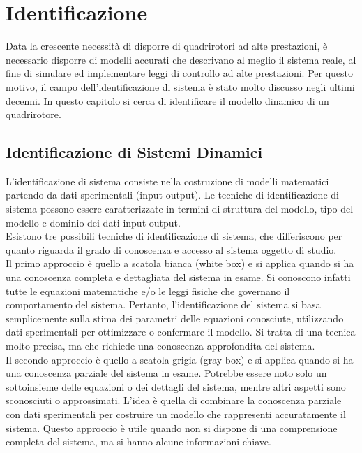 
\chapter{Identificazione}\label{ch:ident}
Data la crescente necessità di disporre di quadrirotori ad alte prestazioni, è necessario disporre di modelli accurati che descrivano al meglio il sistema reale, al fine di simulare ed implementare leggi di controllo ad alte prestazioni. Per questo motivo, il campo dell'identificazione di sistema è stato molto discusso negli ultimi decenni. In questo capitolo si cerca di identificare il modello dinamico di un quadrirotore.

\section{Identificazione di Sistemi Dinamici}
L'identificazione di sistema consiste nella costruzione di modelli matematici partendo da dati sperimentali (input-output). Le tecniche di identificazione di sistema possono essere caratterizzate in termini di struttura del modello, tipo del modello e dominio dei dati input-output.\\

Esistono tre possibili tecniche di identificazione di sistema, che differiscono per quanto riguarda il grado di conoscenza e accesso al sistema oggetto di studio.\\

Il primo approccio è quello a scatola bianca (white box) e si applica quando si ha una conoscenza completa e dettagliata del sistema in esame. Si conoscono infatti tutte le equazioni matematiche e/o le leggi fisiche che governano il comportamento del sistema. Pertanto, l'identificazione del sistema si basa semplicemente sulla stima dei parametri delle equazioni conosciute, utilizzando dati sperimentali per ottimizzare o confermare il modello. Si tratta di una tecnica molto precisa, ma che richiede una conoscenza approfondita del sistema.\\

Il secondo approccio è quello a scatola grigia (gray box) e si applica quando si ha una conoscenza parziale del sistema in esame. Potrebbe essere noto solo un sottoinsieme delle equazioni o dei dettagli del sistema, mentre altri aspetti sono sconosciuti o approssimati. L'idea è quella di combinare la conoscenza parziale con dati sperimentali per costruire un modello che rappresenti accuratamente il sistema. Questo approccio è utile quando non si dispone di una comprensione completa del sistema, ma si hanno alcune informazioni chiave.\\

